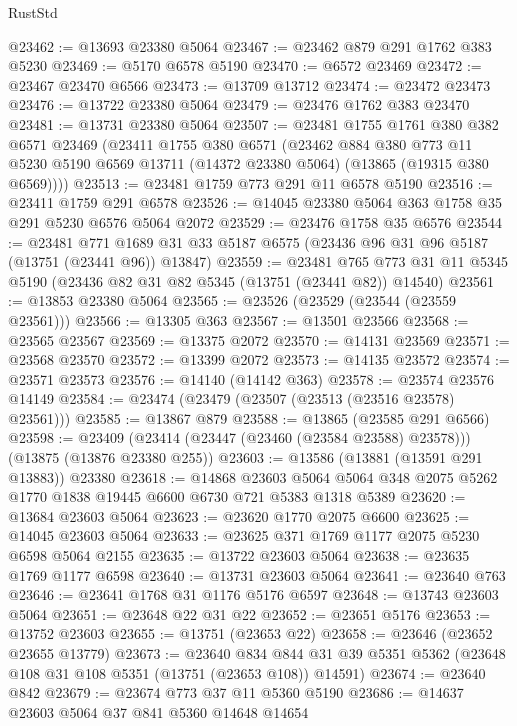 \begin{lexlean}{RustStd}
\begin{coremodule}
@23462 := @13693 @23380 @5064
@23467 := @23462 @879 @291 @1762 @383 @5230
@23469 := @5170 @6578 @5190
@23470 := @6572 @23469
@23472 := @23467 @23470 @6566
@23473 := @13709 @13712
@23474 := @23472 @23473
@23476 := @13722 @23380 @5064
@23479 := @23476 @1762 @383 @23470
@23481 := @13731 @23380 @5064
@23507 := @23481
    @1755
    @1761
    @380
    @382
    @6571
    @23469
    (@23411
      @1755
      @380
      @6571
      (@23462
        @884
        @380
        @773
        @11
        @5230
        @5190
        @6569
        @13711
        (@14372 @23380 @5064)
        (@13865 (@19315 @380 @6569))))
@23513 := @23481 @1759 @773 @291 @11 @6578 @5190
@23516 := @23411 @1759 @291 @6578
@23526 := @14045 @23380 @5064 @363 @1758 @35 @291 @5230 @6576 @5064 @2072
@23529 := @23476 @1758 @35 @6576
@23544 := @23481
    @771
    @1689
    @31
    @33
    @5187
    @6575
    (@23436 @96 @31 @96 @5187 (@13751 (@23441 @96)) @13847)
@23559 := @23481
    @765
    @773
    @31
    @11
    @5345
    @5190
    (@23436 @82 @31 @82 @5345 (@13751 (@23441 @82)) @14540)
@23561 := @13853 @23380 @5064
@23565 := @23526 (@23529 (@23544 (@23559 @23561)))
@23566 := @13305 @363
@23567 := @13501 @23566
@23568 := @23565 @23567
@23569 := @13375 @2072
@23570 := @14131 @23569
@23571 := @23568 @23570
@23572 := @13399 @2072
@23573 := @14135 @23572
@23574 := @23571 @23573
@23576 := @14140 (@14142 @363)
@23578 := @23574 @23576 @14149
@23584 := @23474 (@23479 (@23507 (@23513 (@23516 @23578) @23561)))
@23585 := @13867 @879
@23588 := @13865 (@23585 @291 @6566)
@23598 := @23409 (@23414 (@23447 (@23460 (@23584 @23588) @23578))) (@13875 (@13876 @23380 @255))
@23603 := @13586 (@13881 (@13591 @291 @13883)) @23380
@23618 := @14868
    @23603
    @5064
    @5064
    @348
    @2075
    @5262
    @1770
    @1838
    @19445
    @6600
    @6730
    @721
    @5383
    @1318
    @5389
@23620 := @13684 @23603 @5064
@23623 := @23620 @1770 @2075 @6600
@23625 := @14045 @23603 @5064
@23633 := @23625 @371 @1769 @1177 @2075 @5230 @6598 @5064 @2155
@23635 := @13722 @23603 @5064
@23638 := @23635 @1769 @1177 @6598
@23640 := @13731 @23603 @5064
@23641 := @23640 @763
@23646 := @23641 @1768 @31 @1176 @5176 @6597
@23648 := @13743 @23603 @5064
@23651 := @23648 @22 @31 @22
@23652 := @23651 @5176
@23653 := @13752 @23603
@23655 := @13751 (@23653 @22)
@23658 := @23646 (@23652 @23655 @13779)
@23673 := @23640
    @834
    @844
    @31
    @39
    @5351
    @5362
    (@23648 @108 @31 @108 @5351 (@13751 (@23653 @108)) @14591)
@23674 := @23640 @842
@23679 := @23674 @773 @37 @11 @5360 @5190
@23686 := @14637 @23603 @5064 @37 @841 @5360 @14648 @14654

\end{coremodule}
\end{lexlean}
